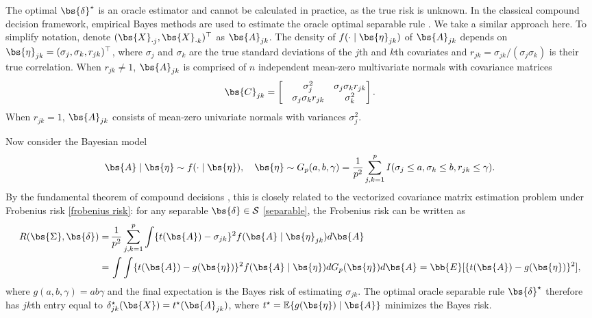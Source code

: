 The optimal $\bs{\delta}^\star$ is an oracle estimator and cannot be calculated in practice, as the true risk is unknown. In the classical compound decision framework, empirical Bayes methods are used to estimate the oracle optimal separable rule \citep{robbins1955empirical, zhang2003compound, brown2009nonparametric, jiang2009general, efron2014two, efron2019bayes}. We take a similar approach here. To simplify notation, denote $(\bs{X}_{\cdot j}, \bs{X}_{\cdot k})^\top$ as $\bs{A}_{jk}$. The density of $f(\cdot \mid \bs{\eta}_{jk})$ of $\bs{A}_{jk}$ depends on $\bs{\eta}_{jk} = (\sigma_j, \sigma_k, r_{jk})^\top$, where $\sigma_j$ and $\sigma_k$ are the true standard deviations of the $j$th and $k$th covariates and $r_{jk} = \sigma_{jk} / (\sigma_j \sigma_k)$ is their true correlation. When $r_{jk} \ne 1$, $\bs{A}_{jk}$ is comprised of $n$ independent mean-zero multivariate normals with covariance matrices
\[
\bs{C}_{jk}=\begin{bmatrix}
&\sigma_j^2 & \sigma_j\sigma_k r_{jk} \\
& \sigma_j\sigma_k r_{jk}  & \sigma_k^2
\end{bmatrix}.
\]
When $r_{jk} = 1$, $\bs{A}_{jk}$ consists of mean-zero univariate normals with variances $\sigma_j^2$.

Now consider the Bayesian model
\begin{equation}
  \label{bayesian}
  \bs{A} \mid \bs{\eta} \sim f(\cdot \mid \bs{\eta}),
  \quad
  \bs{\eta} \sim G_p(a,b, \gamma) =  \frac{1}{p^2} \sum_{j,k=1}^p I(\sigma_j \leq a, \sigma_k \leq b, r_{jk} \leq \gamma).
\end{equation}
By the fundamental theorem of compound decisions \citep{robbins1951asymptotically, jiang2009general}, this is closely related to the vectorized covariance matrix estimation problem under Frobenius risk \eqref{frobenius risk}: for any separable $\bs{\delta} \in \mathcal{S}$ \eqref{separable}, the Frobenius risk can be written as
\begin{align*}
  R(\bs{\Sigma}, \bs{\delta})
  =\,&
  \frac{1}{p^2} \sum_{j,k = 1}^p
  \int \{t(\bs{A}) - \sigma_{jk} \}^2 f(\bs{A} \mid \bs{\eta}_{jk}) d\bs{A}\\
  =\,&
  \int \int \{t(\bs{A}) - g(\bs{\eta})\}^2 f(\bs{A} \mid \bs{\eta}) dG_p(\bs{\eta}) d\bs{A}
  =
  \bb{E}[\{t(\bs{A}) -  g(\bs{\eta})\}^2],
\end{align*}
where $g(a, b, \gamma) = a b \gamma$ and the final expectation is the Bayes risk of estimating $\sigma_{jk}$. The optimal oracle separable rule $\bs{\delta}^\star$ therefore has $jk$th entry equal to $\delta^\star_{jk}(\bs{X}) = t^\star(\bs{A}_{jk})$, where $t^\star = \mathbb{E}\{g(\bs{\eta}) \mid \bs{A}\}$ minimizes the Bayes risk.

